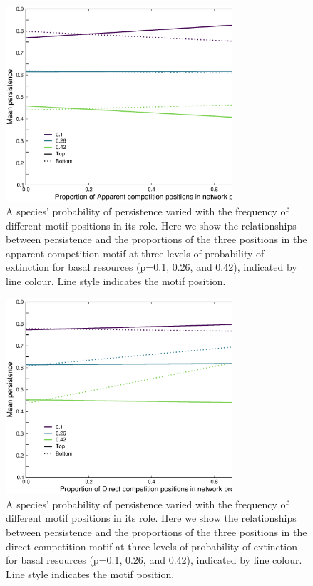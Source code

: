 \documentclass[12pt]{article}
\begin{document}
\begin{spacing}{2.0}
    \begin{figure}
        \centering
        \includegraphics[width=0.75\textwidth]{figures/persistence_positions_Apparent.eps}
        \caption{A species' probability of persistence varied with the frequency of different motif positions in its role. Here we show the relationships between persistence and the proportions of the three positions in the apparent competition motif at three levels of probability of extinction for basal resources (p=0.1, 0.26, and 0.42), indicated by line colour. Line style indicates the motif  position. }
        \label{fig:apparent_positions}
    \end{figure}

    \begin{figure}
        \centering
        \includegraphics[width=0.75\textwidth]{figures/persistence_positions_Direct.eps}
        \caption{A species' probability of persistence varied with the frequency of different motif positions in its role. Here we show the relationships between persistence and the proportions of the three positions in the direct competition motif at three levels of probability of extinction for basal resources (p=0.1, 0.26, and 0.42), indicated by line colour. Line style indicates the motif  position. }
        \label{fig:direct_positions}
    \end{figure}
    

\end{spacing}
\end{document}
